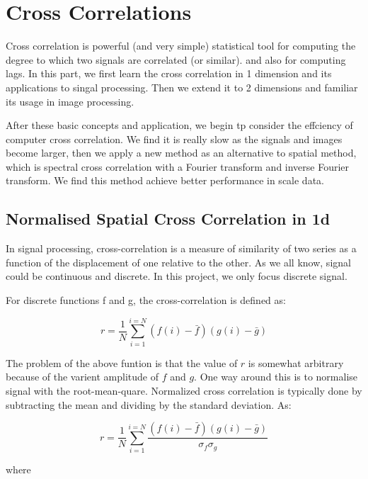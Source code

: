 \chapter{Cross Correlations}\label{part: cross correlations}

Cross correlation is powerful (and very simple) statistical tool for computing the degree to which two signals are correlated (or similar). and also for computing lags. In this part, we first learn the cross correlation in 1 dimension and its applications to singal processing. Then we extend it to 2 dimensions and familiar its usage in image processing. 

After these basic concepts and application, we begin tp consider the effciency of computer cross correlation. We find it is really slow as the signals and images become larger, then we apply a new method as an alternative to spatial method, which is spectral cross correlation with a Fourier transform and inverse Fourier transform. We find this method achieve better performance in scale data.

\section{Normalised Spatial Cross Correlation in 1d}

In signal processing, cross-correlation is a measure of similarity of two series as a function of the displacement of one relative to the other. As we all know, signal could be continuous and discrete. In this project, we only focus discrete signal. 

For discrete functions f and g, the cross-correlation is defined as:

\begin{equation*}
r=\frac{1}{N}
\sum_{i=1}^{i=N}(f(i)-\bar{f})(g(i)-\bar{g})
\end{equation*}

The problem of the above funtion is that the value of $r$ is somewhat arbitrary because of the varient amplitude of $f$ and $g$. One way around this is to normalise signal with the root-mean-quare. Normalized cross correlation is typically done by subtracting the mean and dividing by the standard deviation. As:

\begin{equation*}
r=\frac{1}{N}
\sum_{i=1}^{i=N}
\frac{(f(i)-\bar{f})(g(i)-\bar{g})}{\sigma _{f}\sigma _{g}}
\end{equation*}

where


